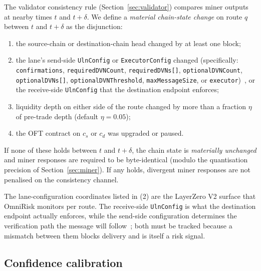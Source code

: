 \documentclass[11pt,a4paper]{article}
\begin{document}
The validator consistency rule (Section~\ref{sec:validator}) compares miner outputs at
nearby times $t$ and $t + \delta$. We define a \emph{material chain-state change} on
route $q$ between $t$ and $t + \delta$ as the disjunction:
\begin{enumerate}
  \item the source-chain or destination-chain head changed by at least one block;
  \item the lane's send-side \texttt{UlnConfig} or \texttt{ExecutorConfig} changed
        (specifically: \texttt{confirmations}, \texttt{requiredDVNCount},
        \texttt{requiredDVNs[]}, \texttt{optionalDVNCount}, \texttt{optionalDVNs[]},
        \texttt{optionalDVNThreshold}, \texttt{maxMessageSize}, or
        \texttt{executor})~\cite{layerzero2024oft,zarick2024layerzero}, or the
        receive-side \texttt{UlnConfig} that the destination endpoint enforces;
  \item liquidity depth on either side of the route changed by more than a fraction
        $\eta$ of pre-trade depth (default $\eta = 0.05$);
  \item the OFT contract on $c_s$ or $c_d$ was upgraded or paused.
\end{enumerate}
If none of these holds between $t$ and $t + \delta$, the chain state is \emph{materially
unchanged} and miner responses are required to be byte-identical (modulo the
quantisation precision of Section~\ref{sec:miner}). If any holds, divergent miner
responses are not penalised on the consistency channel.

The lane-configuration coordinates listed in (2) are the LayerZero V2 surface that
OmniRisk monitors per route. The receive-side \texttt{UlnConfig} is what the destination
endpoint actually enforces, while the send-side configuration determines the verification
path the message will follow~\cite{zarick2024layerzero}; both must be tracked because a
mismatch between them blocks delivery and is itself a risk signal.

\subsection{Confidence calibration}\label{sec:formal:calibration}
\end{document}

